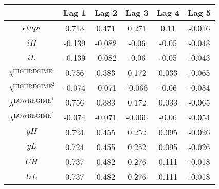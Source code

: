 \begin{tabular}{c|ccccc|}
  & Lag 1 & Lag 2 & Lag 3 & Lag 4 & Lag 5\\
\hline
${e\!t\!a\!p\!i}$ & 0.713 & 0.471 & 0.271 & 0.11 & -0.016 \\
${i\!H}$ & -0.139 & -0.082 & -0.06 & -0.05 & -0.043 \\
${i\!L}$ & -0.139 & -0.082 & -0.06 & -0.05 & -0.043 \\
$\lambda^{\mathrm{HIGHREGIME}^{\mathrm{1}}}$ & 0.756 & 0.383 & 0.172 & 0.033 & -0.065 \\
$\lambda^{\mathrm{HIGHREGIME}^{\mathrm{2}}}$ & -0.074 & -0.071 & -0.066 & -0.06 & -0.054 \\
$\lambda^{\mathrm{LOWREGIME}^{\mathrm{1}}}$ & 0.756 & 0.383 & 0.172 & 0.033 & -0.065 \\
$\lambda^{\mathrm{LOWREGIME}^{\mathrm{2}}}$ & -0.074 & -0.071 & -0.066 & -0.06 & -0.054 \\
${y\!H}$ & 0.724 & 0.455 & 0.252 & 0.095 & -0.026 \\
${y\!L}$ & 0.724 & 0.455 & 0.252 & 0.095 & -0.026 \\
${U\!H}$ & 0.737 & 0.482 & 0.276 & 0.111 & -0.018 \\
${U\!L}$ & 0.737 & 0.482 & 0.276 & 0.111 & -0.018 \\
\hline
\end{tabular}


